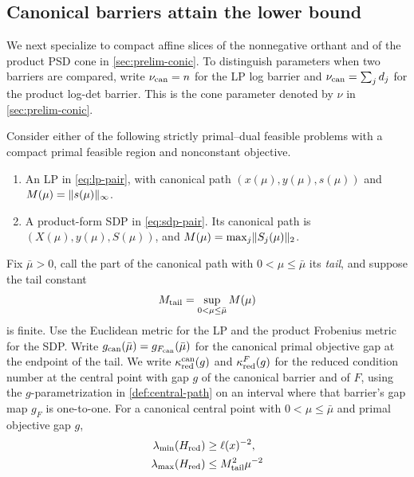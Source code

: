 \subsection{Canonical barriers attain the lower bound}
\label{sec:conditioning-achievability}

We next specialize to compact affine slices of the nonnegative orthant and of
the product PSD cone in \cref{sec:prelim-conic}.  To distinguish parameters
when two barriers are compared, write $\nu_{\rm can}=n$ for the LP log
barrier and $\nu_{\rm can}=\sum_jd_j$ for the product log-det barrier.  This
is the cone parameter denoted by $\nu$ in \cref{sec:prelim-conic}.

\begin{theorem}
\label{thm:canonical-achievability}
Consider either of the following strictly primal--dual feasible problems with
a compact primal feasible region and nonconstant objective.
\begin{enumerate}[label=\textup{(\roman*)}]
 \item An LP in \eqref{eq:lp-pair}, with canonical path
 $(x(\mu),y(\mu),s(\mu))$ and $M(\mu)=\lVert s(\mu)\rVert_\infty$.
 \item A product-form SDP in \eqref{eq:sdp-pair}.  Its canonical path is
 $(X(\mu),y(\mu),S(\mu))$, and
 $M(\mu)=\max_j\lVert S_j(\mu)\rVert_2$.
\end{enumerate}
Fix $\bar\mu>0$, call the part of the canonical path with
$0<\mu\leq\bar\mu$ its \emph{tail}, and suppose the tail constant
\begin{equation}
 M_{\rm tail}=\sup_{0<\mu\leq\bar\mu}M(\mu)
 \label{eq:dual-tail-constant}
\end{equation}
is finite.  Use the Euclidean metric for the LP and the product Frobenius
metric for the SDP.  Write
$g_{\rm can}(\bar\mu)=g_{F_{\rm can}}(\bar\mu)$ for the canonical primal
objective gap at the endpoint of the tail.  We write
$\kappa_{\rm red}^{\rm can}(g)$ and $\kappa_{\rm red}^{F}(g)$ for the reduced
condition number at the central point with gap $g$ of the canonical barrier
and of $F$, using the $g$-parametrization in \cref{def:central-path} on an
interval where that barrier's gap map $g_F$ is one-to-one.  For a
canonical central point with $0<\mu\leq\bar\mu$ and primal objective gap $g$,
\begin{align}
 \lambda_{\min}(H_{\rm red})&\geq\ell(x)^{-2},
 \label{eq:canonical-lmin}\\
 \lambda_{\max}(H_{\rm red})&\leq M_{\rm tail}^2\mu^{-2}

\end{align}
\end{theorem}
